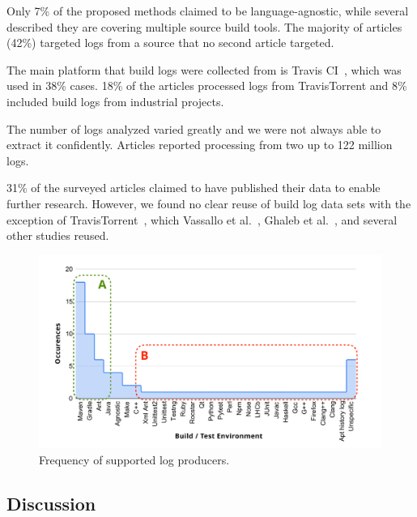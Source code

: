 Only 7\% of the proposed methods claimed to be language-agnostic, while
several described they are covering multiple source build tools.
The majority of articles (42\%) targeted logs from a source that no
second article
targeted.

The main platform that build logs were collected from is Travis
CI~\cite{travisci2019webpage},
which was used in 38\% cases.
18\% of the articles processed logs from TravisTorrent and 8\% included
build logs from industrial projects.

The number of logs analyzed varied greatly and we were not always able to
extract it confidently.
Articles reported processing from two up to 122 million logs.

31\% of the surveyed articles claimed to have published their data to
enable further research.
However, we found no clear reuse of build log data sets with the
exception of TravisTorrent~\cite{beller2017travistorrent}, which
Vassallo et al.~\cite{vassallo2017a-tale},
Ghaleb et al.~\cite{ghaleb2019studying}, and several other studies reused.

\begin{figure}[tbhp]
		\centering
		\includegraphics[width=\columnwidth, trim={1.1cm 0.4cm
		1.5cm 0.5cm},
		clip]{img/lit-sur/log_producer_annotated.pdf}
		\caption{Frequency of supported log producers.}
		\label{fig:litsur:log_producer}
\end{figure}


\subsection{Discussion}
\label{sec:lit-sur:discussion}

